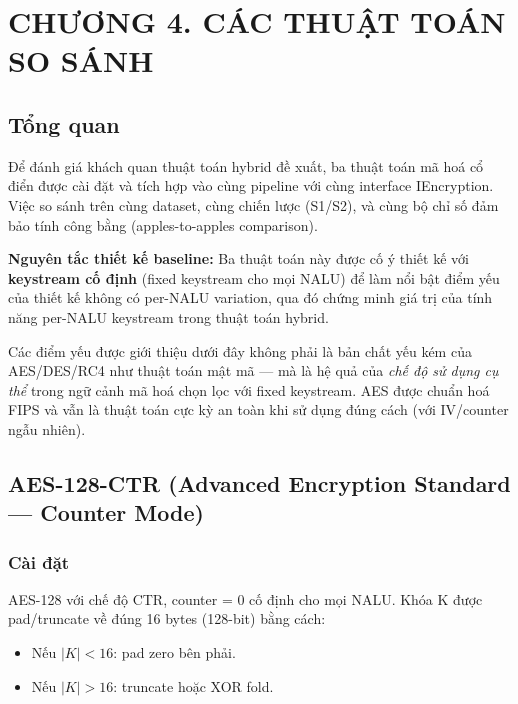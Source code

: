 \clearpage
{}
\section*{CHƯƠNG 4. CÁC THUẬT TOÁN SO SÁNH}
\label{ch:baseline}
\setcounter{section}{4}
\setcounter{subsection}{0}
\setcounter{figure}{0}
\setcounter{table}{0}
\setcounter{equation}{0}

\subsection{Tổng quan}

Để đánh giá khách quan thuật toán hybrid đề xuất, ba thuật toán mã hoá cổ điển
được cài đặt và tích hợp vào cùng pipeline với cùng interface IEncryption.
Việc so sánh trên cùng dataset, cùng chiến lược (S1/S2), và cùng bộ chỉ số
đảm bảo tính công bằng (apples-to-apples comparison).

\textbf{Nguyên tắc thiết kế baseline:}
Ba thuật toán này được cố ý thiết kế với \textbf{keystream cố định}
(fixed keystream cho mọi NALU) để làm nổi bật điểm yếu của thiết kế không có
per-NALU variation, qua đó chứng minh giá trị của tính năng per-NALU keystream
trong thuật toán hybrid.

Các điểm yếu được giới thiệu dưới đây không phải là bản chất yếu kém của AES/DES/RC4
như thuật toán mật mã --- mà là hệ quả của \emph{chế độ sử dụng cụ thể} trong
ngữ cảnh mã hoá chọn lọc với fixed keystream. AES được chuẩn hoá FIPS và vẫn
là thuật toán cực kỳ an toàn khi sử dụng đúng cách (với IV/counter ngẫu nhiên).

\subsection{AES-128-CTR (Advanced Encryption Standard --- Counter Mode)}

\subsubsection{Cài đặt}

AES-128 với chế độ CTR, counter = 0 cố định cho mọi NALU. Khóa K được
pad/truncate về đúng 16 bytes (128-bit) bằng cách:
\begin{itemize}
  \item Nếu $|K| < 16$: pad zero bên phải.
  \item Nếu $|K| > 16$: truncate hoặc XOR fold.
\end{itemize}

